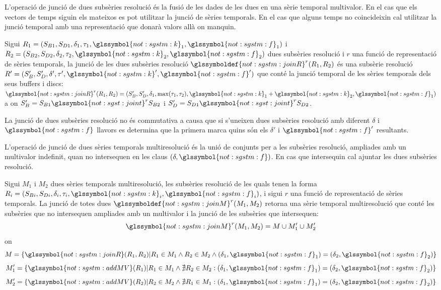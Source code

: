 L'operació de junció de dues subsèries resolució és la fusió de les
dades de les dues en una sèrie temporal multivalor. En el cas que els
vectors de temps siguin els mateixos es pot utilitzar la junció de
sèries temporals. En el cas que alguns temps no coincideixin cal
utilitzar la junció temporal amb una representació que donarà valors
allà on manquin.
\begin{definition}
  Sigui
  $R_1=(S_{B1},S_{D1},\delta_1,\tau_1,\glssymbol{not:sgstm:k}_1,\glssymbol{not:sgstm:f}_1)$
  i
  $R_2=(S_{B2},S_{D2},\delta_2,\tau_2,\glssymbol{not:sgstm:k}_2,\glssymbol{not:sgstm:f}_2)$
  dues subsèries resolució i $r$ una funció de representació de sèries
  temporals, la junció de les dues subsèries resolució
  $\glssymboldef{not:sgstm:joinR}^r(R_1,R_2)$ és una subsèrie
  resolució $R' =
  (S'_B,S'_D,\delta',\tau',\glssymbol{not:sgstm:k}',\glssymbol{not:sgstm:f}')$
  que conté la junció temporal de les sèries temporals dels seus
  buffers i discs: $\glssymbol{not:sgstm:joinR}^r(R_1,R_2)=
  (S'_B,S'_D,\delta_1,\max(\tau_1,\tau_2),\glssymbol{not:sgstm:k}_1+\glssymbol{not:sgstm:k}_2,\glssymbol{not:sgstm:f}_1)$
  a on $S'_B = S_{B1} \glssymbol{not:sgst:joint}^r S_{B2}$ i $S'_D =
  S_{D1} \glssymbol{not:sgst:joint}^r S_{D2}$.
\end{definition}
La junció de dues subsèries resolució no és commutativa a causa que si
s'uneixen dues subsèries resolució amb diferent $\delta$ i
$\glssymbol{not:sgstm:f}$ llavors es determina que la primera marca
quins són els $\delta'$ i $\glssymbol{not:sgstm:f}'$ resultants.



L'operació de junció de dues sèries temporals multiresolució és la
unió de conjunts per a les subsèries resolució, ampliades amb un
multivalor indefinit, quan no intersequen en les claus
$(\delta,\glssymbol{not:sgstm:f})$. En cas que intersequin cal ajuntar
les dues subsèries resolució.
\begin{definition}
  Sigui $M_1$ i $M_2$ dues sèries temporals multiresolució, les
  subsèries resolució de les quals tenen la forma
  $R_i=(S_{Bi},S_{Di},\delta_i,\tau_i,\glssymbol{not:sgstm:k}_i,\glssymbol{not:sgstm:f}_i)$,
  i sigui $r$ una funció de representació de sèries temporals. La
  junció de totes dues $\glssymboldef{not:sgstm:joinM}^r(M_1, M_2)$
  retorna una sèrie temporal multiresolució que conté les subsèries
  que no intersequen ampliades amb un multivalor i la junció de les
  subsèries que intersequen:
  \[\glssymbol{not:sgstm:joinM}^r(M_1, M_2)= M \cup M'_{1} \cup
  M'_{2}\] on 
  \[
  M = \{ \glssymbol{not:sgstm:joinR}(R_1,R_2) | R_1\in M_1 \wedge
  R_2\in M_2 \wedge (\delta_1,\glssymbol{not:sgstm:f}_1) =
  (\delta_2,\glssymbol{not:sgstm:f}_2) \}
  \]
  \[
  M_1' = \{\glssymbol{not:sgstm:addMV}(R_1) | R_1\in M_1 \wedge
  \nexists R_2 \in M_2 : (\delta_1,\glssymbol{not:sgstm:f}_1) =
  (\delta_2,\glssymbol{not:sgstm:f}_2) \}
  \]
  \[
  M_2' = \{\glssymbol{not:sgstm:addMV}(R_2)| R_2\in
  M_2 \wedge \nexists R_1 \in M_1 :
  (\delta_1,\glssymbol{not:sgstm:f}_1) =
  (\delta_2,\glssymbol{not:sgstm:f}_2) \}
  \]
\end{definition}





